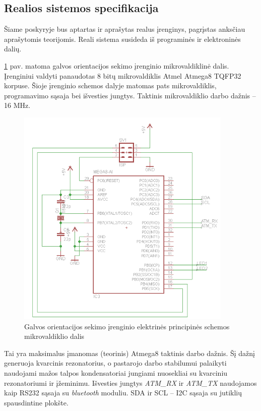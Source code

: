 \documentclass[]{vgtuef}
\begin{document}
{\subsection{Realios sistemos specifikacija}

Šiame poskyryje bus aptartas ir aprašytas realus įrenginys, pagrįstas anksčiau aprašytomis teorijomis. Reali sistema susideda iš programinės ir elektroninės dalių.

\ref{fig:headtracker_schematic} pav. matoma galvos orientacijos sekimo įrenginio mikrovaldiklinė dalis. Įrenginiui valdyti panaudotas 8 bitų mikrovaldiklis Atmel Atmega8 TQFP32 korpuse. Šioje įrenginio schemos dalyje matomas pats mikrovaldiklis, programavimo sąsaja bei išvesties jungtys. Taktinis mikrovaldiklio darbo dažnis – 16 MHz.

\begin{figure}[htbp]
  \centering
  \includegraphics[width=390px]{img/headtracker_schematic.png}
  \caption{Galvos orientacijos sekimo įrenginio elektrinės principinės schemos mikrovaldiklio dalis}
  \label{fig:headtracker_schematic}
\end{figure}

Tai yra maksimalus įmanomas (teorinis) Atmega8 taktinis darbo dažnis. Šį dažnį generuoja kvarcinis rezonatorius, o pastarojo darbo stabilumui palaikyti naudojami mažos talpos kondensatoriai jungiami nuosekliai su kvarciniu rezonatoriumi ir įžeminimu. Išvesties jungtys \textit{ATM\_RX} ir \textit{ATM\_TX} naudojamos kaip RS232 sąsaja su \textit{bluetooth} moduliu. SDA ir SCL – I2C  sąsaja su jutiklių spausdintine plokšte.

}
\end{document}
